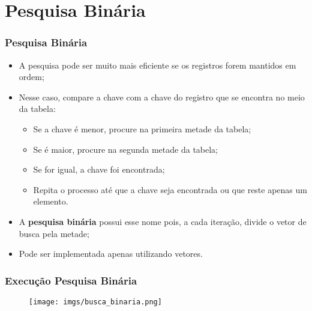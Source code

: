 \documentclass[aspectratio=169]{beamer}
\begin{document}
\section{Pesquisa Binária}

\begin{frame}
\frametitle{Pesquisa Binária}
\begin{itemize}
\item A pesquisa pode ser muito mais eficiente se os registros forem mantidos em ordem;
\item Nesse caso, compare a chave com a chave do registro que se encontra no meio da tabela:
\begin{itemize}
\item Se a chave é menor, procure na primeira metade da tabela;
\item Se é maior, procure na segunda metade da tabela;
\item Se for igual, a chave foi encontrada;
\item Repita o processo até que a chave seja encontrada ou que reste apenas um elemento.
\end{itemize}
\item A {\bf pesquisa binária} possui esse nome pois, a cada iteração, divide o vetor de busca pela metade;
\item Pode ser implementada apenas utilizando vetores.
\end{itemize}
\end{frame}


\begin{frame}
\frametitle{Execução Pesquisa Binária}
\begin{figure}[!h]
  \centering
  \texttt{[image: imgs/busca\_binaria.png]}
  \label{fig_busca_binaria}
\end{figure}

\end{frame}

\end{document}

